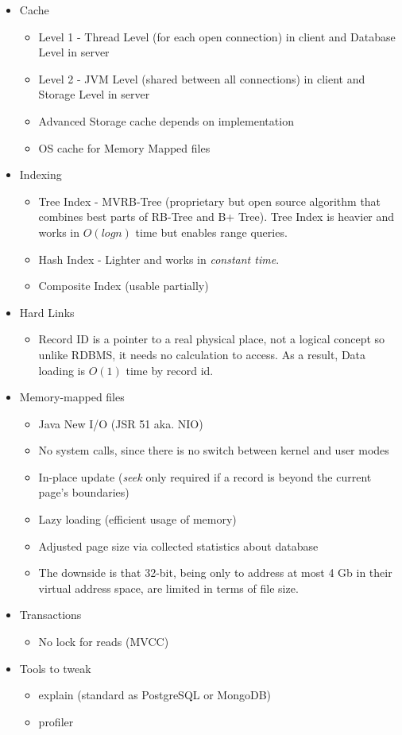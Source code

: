 \begin{itemize}
  \item Cache
  \begin{itemize}
    \item Level 1 - Thread Level (for each open connection) in client and Database Level in server
    \item Level 2 - JVM Level (shared between all connections) in client and Storage Level in server
    \item Advanced Storage cache depends on implementation
    \item OS cache for Memory Mapped files
  \end{itemize}
  \item Indexing
  \begin{itemize}
    \item Tree Index - MVRB-Tree (proprietary but open source algorithm that combines best parts of RB-Tree and B+ Tree). Tree Index is heavier and works in $O(logn)$ time but enables range queries.
    \item Hash Index - Lighter and works in \textit{constant time}.
    \item Composite Index (usable partially)
  \end{itemize}
  \item Hard Links
  \begin{itemize}
    \item Record ID is a pointer to a real physical place, not a logical concept so unlike RDBMS, it needs no calculation to access. As a result, Data loading is $O(1)$ time by record id.
  \end{itemize}
  \item Memory-mapped files
  \begin{itemize}
    \item Java New I/O (JSR 51 aka. NIO)
    \item No system calls, since there is no switch between kernel and user modes
	\item In-place update (\textit{seek} only required if a record is beyond the current page's boundaries)
	\item Lazy loading (efficient usage of memory)
	\item Adjusted page size via collected statistics about database
	\item The downside is that 32-bit, being only to address at most 4 Gb in their virtual address space, are limited in terms of file size.
  \end{itemize}
  \item Transactions
  \begin{itemize}
    \item No lock for reads (MVCC)
  \end{itemize}
  \item Tools to tweak
  \begin{itemize}
    \item explain (standard as PostgreSQL or MongoDB)
    \item profiler
  \end{itemize}
\end{itemize}

